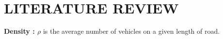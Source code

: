 \chapter{LITERATURE REVIEW}

\textbf{Density : $\rho$} is the average number of vehicles on a given length of road.  







